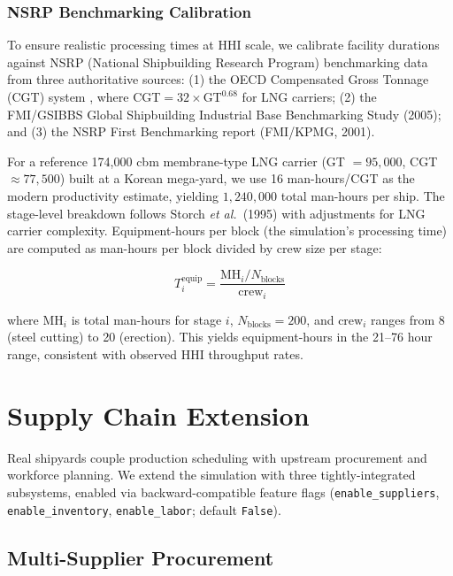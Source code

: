 \documentclass[11pt,a4paper]{article}
\newcommand{\etal}{\textit{et al.}}
\begin{document}
\subsubsection{NSRP Benchmarking Calibration}

To ensure realistic processing times at HHI scale, we calibrate facility durations against NSRP (National Shipbuilding Research Program) benchmarking data from three authoritative sources: (1) the OECD Compensated Gross Tonnage (CGT) system \citep{oecd2007cgt}, where CGT$= 32 \times \text{GT}^{0.68}$ for LNG carriers; (2) the FMI/GSIBBS Global Shipbuilding Industrial Base Benchmarking Study (2005); and (3) the NSRP First Benchmarking report (FMI/KPMG, 2001).

For a reference 174,000 cbm membrane-type LNG carrier (GT $= 95{,}000$, CGT $\approx 77{,}500$) built at a Korean mega-yard, we use 16 man-hours/CGT as the modern productivity estimate, yielding $1{,}240{,}000$ total man-hours per ship. The stage-level breakdown follows Storch \etal~(1995) with adjustments for LNG carrier complexity. Equipment-hours per block (the simulation's processing time) are computed as man-hours per block divided by crew size per stage:

\begin{equation}
T_i^{\text{equip}} = \frac{\text{MH}_i / N_{\text{blocks}}}{\text{crew}_i}
\label{eq:nsrp_time}
\end{equation}

\noindent where $\text{MH}_i$ is total man-hours for stage $i$, $N_{\text{blocks}} = 200$, and $\text{crew}_i$ ranges from 8 (steel cutting) to 20 (erection). This yields equipment-hours in the 21--76 hour range, consistent with observed HHI throughput rates.

\section{Supply Chain Extension}
\label{sec:supply_chain}

Real shipyards couple production scheduling with upstream procurement and workforce planning. We extend the simulation with three tightly-integrated subsystems, enabled via backward-compatible feature flags (\texttt{enable\_suppliers}, \texttt{enable\_inventory}, \texttt{enable\_labor}; default \texttt{False}).

\subsection{Multi-Supplier Procurement}
\end{document}
